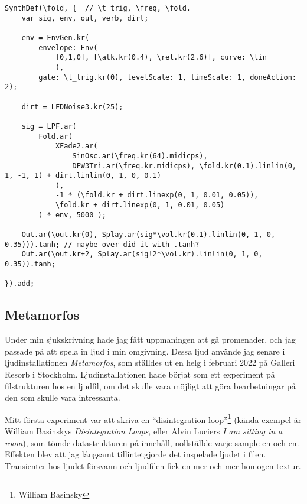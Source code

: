 \documentclass{article}
\renewcommand{\baselinestretch}{1.5}
\begin{document}
\renewcommand{\baselinestretch}{1}
\begin{lstlisting}[style=SuperCollider-IDE, caption=Fold-SynthDef från K87-89]
SynthDef(\fold, {  // \t_trig, \freq, \fold.
	var sig, env, out, verb, dirt;

	env = EnvGen.kr(
		envelope: Env(
			[0,1,0], [\atk.kr(0.4), \rel.kr(2.6)], curve: \lin
			), 
		gate: \t_trig.kr(0), levelScale: 1, timeScale: 1, doneAction: 2);

	dirt = LFDNoise3.kr(25);

	sig = LPF.ar( 
		Fold.ar(
			XFade2.ar(
				SinOsc.ar(\freq.kr(64).midicps), 
				DPW3Tri.ar(\freq.kr.midicps), \fold.kr(0.1).linlin(0, 1, -1, 1) + dirt.linlin(0, 1, 0, 0.1)
			),
			-1 * (\fold.kr + dirt.linexp(0, 1, 0.01, 0.05)),
			\fold.kr + dirt.linexp(0, 1, 0.01, 0.05)
		) * env, 5000 );

	Out.ar(\out.kr(0), Splay.ar(sig*\vol.kr(0.1).linlin(0, 1, 0, 0.35))).tanh; // maybe over-did it with .tanh?
	Out.ar(\out.kr+2, Splay.ar(sig!2*\vol.kr).linlin(0, 1, 0, 0.35)).tanh;

}).add;
\end{lstlisting}
\renewcommand{\baselinestretch}{1.5}

\subsection{Metamorfos}
Under min sjukskrivning hade jag fått uppmaningen att gå promenader, och jag passade på att spela in ljud i
min omgivning. Dessa ljud använde jag senare i ljudinstallationen \emph{Metamorfos}, som ställdes ut en helg i
februari 2022 på Galleri Resorb i Stockholm. Ljudinstallationen hade börjat som ett experiment på
filstrukturen hos en ljudfil, om det skulle vara möjligt att göra bearbetningar på den som skulle vara
intressanta. 

Mitt första experiment var att skriva en ``disintegration loop''\footnote{William Basinsky} (kända
exempel är William Basinskys \emph{Disintegration Loops}, eller Alvin Luciers \emph{I am sitting in a room}), som
tömde datastrukturen på innehåll, nollställde varje sample en och en. Effekten blev att jag långsamt
tillintetgjorde det inspelade ljudet i filen. Transienter hos ljudet försvann och ljudfilen fick en mer och
mer homogen textur.
\end{document}
